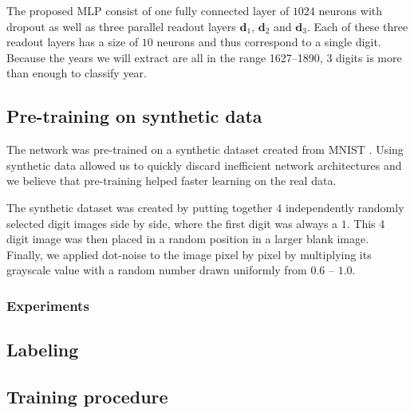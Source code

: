 The proposed MLP consist of one fully connected layer of $1024$ neurons with dropout as well as three parallel readout layers $\mathbf{d}_1$, $\mathbf{d}_2$ and $\mathbf{d}_3$. Each of these three readout layers has a size of $10$ neurons and thus correspond to a single digit.
Because the years we will extract are all in the range 1627--1890, $3$ digits is more than enough to classify year.





\subsection{Pre-training on synthetic data}

The network was pre-trained on a synthetic dataset created from MNIST \cite{MNIST}. Using synthetic data allowed us to quickly discard inefficient network architectures and we believe that pre-training helped faster learning on the real data.

The synthetic dataset was created by putting together 4 independently randomly selected digit images side by side, where the first digit was always a $1$. This 4 digit image was then placed in a random position in a larger blank image. Finally, we applied dot-noise to the image pixel by pixel by multiplying its grayscale value with a random number drawn uniformly from $0.6$ -- $1.0$.


\subsubsection{Experiments}



\subsection{Labeling}


\subsection{Training procedure}

